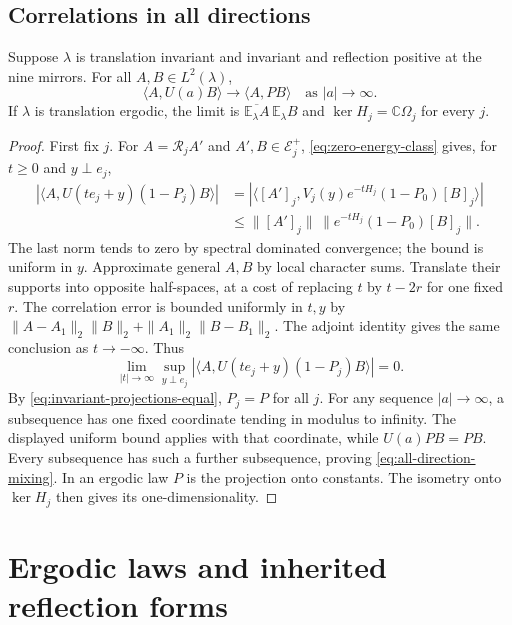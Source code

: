 \documentclass[11pt,letterpaper,reqno]{amsart}
\newcommand{\C}{\mathbb C}
\newcommand{\E}{\mathbb E}
\begin{document}
\subsection{Correlations in all directions}

\begin{proposition}\label{prop:all-direction-mixing}
Suppose $\lambda$ is translation invariant and invariant and
reflection positive at the nine mirrors. For all $A,B\in L^2(\lambda)$,
\begin{equation}\label{eq:all-direction-mixing}
 \langle A,U(a)B\rangle\longrightarrow\langle A,PB\rangle
                      \quad\text{as }|a|\longrightarrow\infty.
\end{equation}
If $\lambda$ is translation ergodic, the limit is
$\overline{\E_\lambda A}\,\E_\lambda B$ and
$\ker H_j=\C\Omega_j$ for every $j$.
\end{proposition}

\begin{proof}
First fix $j$. For $A=\mathcal R_jA'$ and $A',B\in\mathcal E_j^+$,
\eqref{eq:zero-energy-class} gives, for $t\ge0$ and $y\perp e_j$,
\begin{align*}
 |\langle A,U(te_j+y)(1-P_j)B\rangle|
 &=|\langle[A']_j,V_j(y)e^{-tH_j}(1-P_0)[B]_j\rangle|\\
 &\le\|[A']_j\|\,\|e^{-tH_j}(1-P_0)[B]_j\|.
\end{align*}
The last norm tends to zero by spectral dominated convergence;
the bound is uniform in $y$. Approximate general $A,B$ by local
character sums. Translate their supports into opposite half-spaces,
at a cost of replacing $t$ by $t-2r$ for one fixed $r$.
The correlation error is bounded uniformly in $t,y$ by
$\|A-A_1\|_2\|B\|_2+\|A_1\|_2\|B-B_1\|_2$.
The adjoint identity gives the same conclusion as $t\to-\infty$.
Thus
\[
 \lim_{|t|\to\infty}\sup_{y\perp e_j}
 |\langle A,U(te_j+y)(1-P_j)B\rangle|=0.
\]
By \eqref{eq:invariant-projections-equal}, $P_j=P$ for all $j$.
For any sequence $|a|\to\infty$, a subsequence has one fixed
coordinate tending in modulus to infinity. The displayed uniform
bound applies with that coordinate, while $U(a)PB=PB$.
Every subsequence has such a further subsequence, proving
\eqref{eq:all-direction-mixing}. In an ergodic law $P$ is the
projection onto constants. The isometry onto $\ker H_j$ then gives
its one-dimensionality.
\end{proof}

\section{Ergodic laws and inherited reflection forms}
\label{subsec:component-hypotheses}
\end{document}
